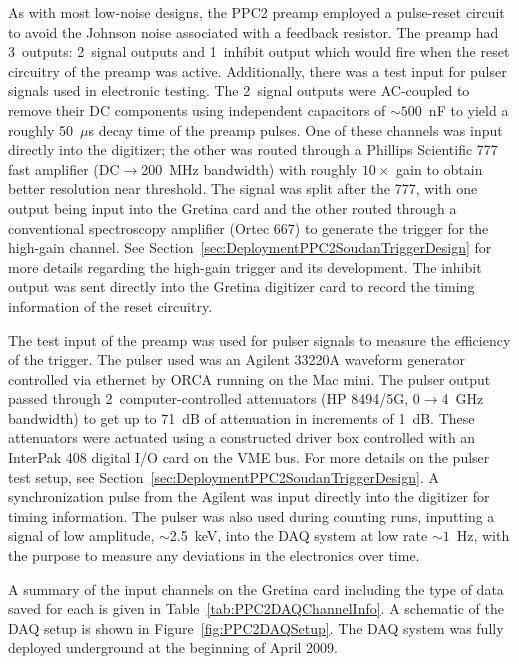 	As with most low-noise designs, the PPC2 preamp employed a pulse-reset circuit to avoid the Johnson noise associated with a feedback resistor.  The preamp had 3~outputs: 2~signal outputs and 1~inhibit output which would fire when the reset circuitry of the preamp was active.  Additionally, there was a test input for pulser signals used in electronic testing.  The 2~signal outputs were AC-coupled to remove their DC components using independent capacitors of $\sim500$~nF to yield a roughly 50~$\mu$s decay time of the preamp pulses.  One of these channels was input directly into the digitizer; the other was routed through a Phillips Scientific 777 fast amplifier (DC$\to$200~MHz bandwidth) with roughly $10\times$ gain to obtain better resolution near threshold.  The signal was split after the 777, with one output being input into the Gretina card and the other routed through a conventional spectroscopy amplifier (Ortec 667) to generate the trigger for the high-gain channel.  See Section~\ref{sec:DeploymentPPC2SoudanTriggerDesign} for more details regarding the high-gain trigger and its development.  The inhibit output was sent directly into the Gretina digitizer card to record the timing information of the reset circuitry.
	
	The test input of the preamp was used for pulser signals to measure the efficiency of the trigger.  The pulser used was an Agilent 33220A waveform generator controlled via ethernet by ORCA running on the Mac mini.  The pulser output passed through 2~computer-controlled attenuators (HP 8494/5G, 0$\to$4~GHz bandwidth) to get up to 71~dB of attenuation in increments of 1~dB.  These attenuators were actuated using a constructed driver box controlled with an InterPak 408 digital I/O card on the VME bus.  For more details on the pulser test setup, see Section~\ref{sec:DeploymentPPC2SoudanTriggerDesign}.  A synchronization pulse from the Agilent was input directly into the digitizer for timing information.  The pulser was also used during counting runs, inputting a signal of low amplitude, $\sim$2.5~keV, into the DAQ system at low rate $\sim1$~Hz, with the purpose to measure any deviations in the electronics over time.
		     
	A summary of the input channels on the Gretina card including the type of data saved for each is given in Table~\ref{tab:PPC2DAQChannelInfo}.  A schematic of the DAQ setup is shown in Figure~\ref{fig:PPC2DAQSetup}.  The DAQ system was fully deployed underground at the beginning of April 2009.
		 
